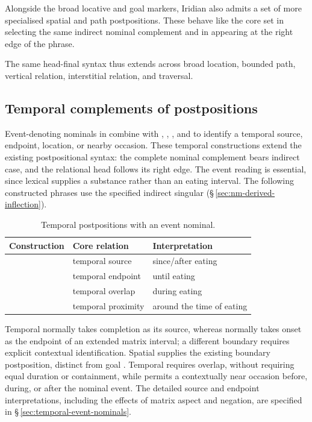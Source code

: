Alongside the broad locative and goal markers, Iridian also admits a set of more
specialised spatial and path postpositions. These behave like the core set in
selecting the same indirect nominal complement and in appearing at the right
edge of the phrase.

\pex
\a {} 
\a {} 
\a {} 
\a {} 
\a {} 
\xe

The same head-final syntax thus extends across broad location, bounded path,
vertical relation, interstitial relation, and traversal.

\subsection{Temporal complements of postpositions}
\label{sec:nm-postp-temporal}

Event-denoting nominals in  combine with , ,
, and  to identify a temporal source, endpoint, location, or
nearby occasion. These temporal constructions extend the existing
postpositional syntax: the complete nominal complement bears indirect case,
and the relational head follows its right edge. The event reading is
essential, since lexical   supplies a substance
rather than an eating interval. The following constructed phrases use the
specified indirect singular 
(§\,\ref{sec:nm-derived-inflection}).

\begin{table}[ht]
\footnotesize
\caption{Temporal postpositions with an event nominal.}
\label{tab:nm-temporal-postpositions}
\begin{tabularx}{\textwidth}{l L L}
\toprule
Construction & Core relation & Interpretation \\
\midrule
{} & temporal source & since/after eating \\
 & temporal endpoint & until eating \\
 & temporal overlap & during eating \\
 & temporal proximity & around the time of eating \\
\bottomrule
\end{tabularx}
\end{table}

Temporal  normally takes completion as its source, whereas 
normally takes onset as the endpoint of an extended matrix interval; a
different boundary requires explicit contextual identification. Spatial
  supplies the existing boundary
postposition, distinct from goal . Temporal  requires overlap,
without requiring equal duration or containment, while  permits a
contextually near occasion before, during, or after the nominal event.
The detailed source and endpoint interpretations, including the effects of
matrix aspect and negation, are specified in
§\,\ref{sec:temporal-event-nominals}.

